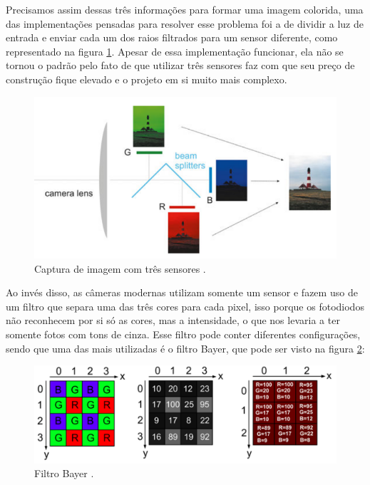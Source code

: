 \documentclass[
  brazilian,
]{book}
\begin{document}
Precisamos assim dessas três informações para formar uma imagem colorida, uma das implementações pensadas para resolver esse problema foi a de dividir a luz de entrada e enviar cada um dos raios filtrados para um sensor diferente, como representado na figura \ref{fig:tressensores}. Apesar de essa implementação funcionar, ela não se tornou o padrão pelo fato de que utilizar três sensores faz com que seu preço de construção fique elevado e o projeto em si muito mais complexo.



\begin{figure}

{\centering \includegraphics[width=0.6\linewidth]{imagens/02-formacao/tres_sensores} 

}

\caption{Captura de imagem com três sensores \autocite[p.242]{teubner2019}.}\label{fig:tressensores}
\end{figure}

Ao invés disso, as câmeras modernas utilizam somente um sensor e fazem uso de um filtro que separa uma das três cores para cada pixel, isso porque os fotodiodos não reconhecem por si só as cores, mas a intensidade, o que nos levaria a ter somente fotos com tons de cinza. Esse filtro pode conter diferentes configurações, sendo que uma das mais utilizadas é o filtro Bayer, que pode ser visto na figura \ref{fig:bayer}:



\begin{figure}

{\centering \includegraphics[width=0.8\linewidth]{imagens/02-formacao/bayer} 

}

\caption{Filtro Bayer \autocite[p.29]{moeslund2012}.}\label{fig:bayer}
\end{figure}
\end{document}
